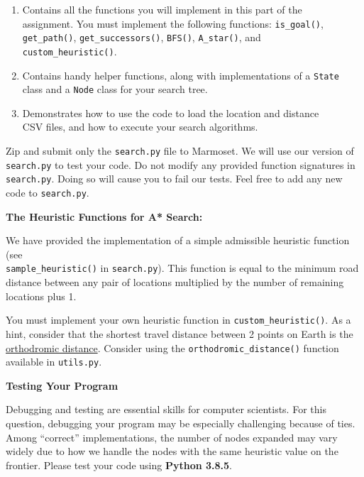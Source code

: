 \documentclass[12pt]{article}
\begin{document}
\begin{enumerate}
    \item 
     Contains all the functions you will implement in this part of the \\ \makebox[2.2cm][l]{} assignment. You must implement the following functions: \verb+is_goal()+, \\ \makebox[2.2cm][l]{} \verb+get_path()+, \verb+get_successors()+, \verb+BFS()+, \verb+A_star()+, and \\ \makebox[2.2cm][l]{} \verb+custom_heuristic()+.
    \item
     Contains handy helper functions, along with implementations of a \verb+State+ \\ \makebox[2.2cm][l]{} class and a \verb+Node+ class for your search tree.
    \item
     Demonstrates how to use the code to load the location and distance \\ \makebox[2.2cm][l]{} CSV files, and how to execute your search algorithms.
\end{enumerate}

Zip and submit only the \verb+search.py+ file to Marmoset. We will use our version of \verb+search.py+ to test your code. Do not modify any provided function signatures in \verb+search.py+. Doing so will cause you to fail our tests. Feel free to add any new code to \verb+search.py+. 

{\bf The Heuristic Functions for A* Search:}

We have provided the implementation of a simple admissible heuristic function (see \\ \texttt{sample\_heuristic()} in \verb+search.py+). This function is equal to the minimum road distance between any pair of locations multiplied by the number of remaining locations plus 1.

You must implement your own heuristic function in \texttt{custom\_heuristic()}. As a hint, consider that the shortest travel distance between 2 points on Earth is the \href{https://en.wikipedia.org/wiki/Great-circle_distance}{orthodromic distance}. Consider using the \texttt{orthodromic\_distance()} function available in \verb+utils.py+.

{\bf Testing Your Program}

Debugging and testing are essential skills for computer scientists. For this question, debugging your program may be especially challenging because of ties. Among ``correct'' implementations, the number of nodes expanded may vary widely due to how we handle the nodes with the same heuristic value on the frontier. Please test your code using {\bf Python 3.8.5}. 
\end{document}
